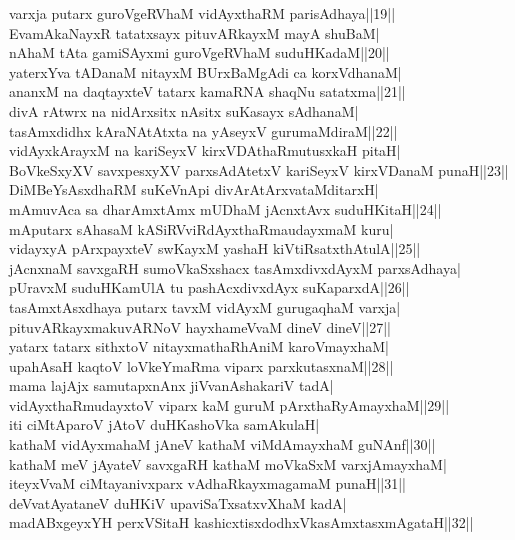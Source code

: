 \documentclass{article}
\begin{document}
varxja putarx guroVgeRVhaM vidAyxthaRM parisAdhaya||19||\\
EvamAkaNayxR tatatxsayx pituvARkayxM mayA shuBaM|\\
nAhaM tAta gamiSAyxmi guroVgeRVhaM suduHKadaM||20||\\
yaterxYva tADanaM nitayxM BUrxBaMgAdi ca korxVdhanaM|\\
ananxM na daqtayxteV tatarx kamaRNA shaqNu satatxma||21||\\
divA rAtwrx na nidArxsitx nAsitx suKasayx sAdhanaM|\\
tasAmxdidhx kAraNAtAtxta na yAseyxV gurumaMdiraM||22||\\
vidAyxkArayxM na kariSeyxV kirxVDAthaRmutusxkaH pitaH|\\
BoVkeSxyXV savxpesxyXV parxsAdAtetxV kariSeyxV kirxVDanaM punaH||23||\\
DiMBeYsAsxdhaRM suKeVnApi divArAtArxvataMditarxH|\\
mAmuvAca sa dharAmxtAmx mUDhaM jAcnxtAvx suduHKitaH||24||\\
mAputarx sAhasaM kASiRVviRdAyxthaRmaudayxmaM kuru|\\
vidayxyA pArxpayxteV swKayxM yashaH kiVtiRsatxthAtulA||25||\\
jAcnxnaM savxgaRH sumoVkaSxshacx tasAmxdivxdAyxM parxsAdhaya|\\
pUravxM suduHKamUlA tu pashAcxdivxdAyx suKaparxdA||26||\\
tasAmxtAsxdhaya putarx tavxM vidAyxM gurugaqhaM varxja|\\
pituvARkayxmakuvARNoV hayxhameVvaM dineV dineV||27||\\
yatarx tatarx sithxtoV nitayxmathaRhAniM karoVmayxhaM|\\
upahAsaH kaqtoV  loVkeYmaRma viparx parxkutasxnaM||28||\\
mama lajAjx samutapxnAnx jiVvanAshakariV tadA|\\
vidAyxthaRmudayxtoV viparx kaM guruM pArxthaRyAmayxhaM||29||\\
iti ciMtAparoV jAtoV duHKashoVka samAkulaH|\\
kathaM vidAyxmahaM jAneV kathaM viMdAmayxhaM guNAnf||30||\\
kathaM meV jAyateV savxgaRH kathaM moVkaSxM varxjAmayxhaM|\\
iteyxVvaM ciMtayanivxparx vAdhaRkayxmagamaM punaH||31||\\
deVvatAyataneV duHKiV upaviSaTxsatxvXhaM kadA|\\
madABxgeyxYH perxVSitaH kashicxtisxdodhxVkasAmxtasxmAgataH||32||\\
\end{document}
